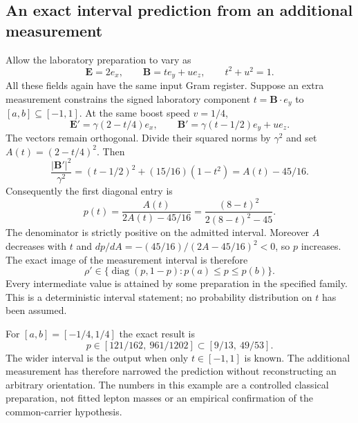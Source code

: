 \subsection{An exact interval prediction from an additional measurement}
Allow the laboratory preparation to vary as
\begin{equation}
 \boldsymbol E=2e_x,\qquad
 \boldsymbol B=t e_y+u e_z,\qquad t^2+u^2=1.
\end{equation}
All these fields again have the same input Gram register. Suppose
an extra measurement constrains the signed laboratory component
$t=\boldsymbol B\cdot e_y$ to $[a,b]\subseteq[-1,1]$. At the
same boost speed $v=1/4$,
\begin{equation}
 \boldsymbol E'=\gamma(2-t/4)e_x,\qquad
 \boldsymbol B'=\gamma(t-1/2)e_y+u e_z.
\end{equation}
The vectors remain orthogonal. Divide their squared norms by
$\gamma^2$ and set $A(t)=(2-t/4)^2$. Then
\begin{equation}
 \frac{|\boldsymbol B'|^2}{\gamma^2}
 =(t-1/2)^2+(15/16)(1-t^2)=A(t)-45/16.
\end{equation}
Consequently the first diagonal entry is
\begin{equation}
 p(t)=\frac{A(t)}{2A(t)-45/16}
     =\frac{(8-t)^2}{2(8-t)^2-45}.
\end{equation}
The denominator is strictly positive on the admitted interval.
Moreover $A$ decreases with $t$ and
$dp/dA=-(45/16)/(2A-45/16)^2<0$, so $p$ increases. The exact
image of the measurement interval is therefore
\begin{equation}
 \rho'\in\{\operatorname{diag}(p,1-p):p(a)\leq p\leq p(b)\}.
\end{equation}
Every intermediate value is attained by some preparation in the
specified family. This is a deterministic interval statement; no
probability distribution on $t$ has been assumed.

For $[a,b]=[-1/4,1/4]$ the exact result is
\begin{equation}
 p\in[121/162,\ 961/1202]
      \subset[9/13,\ 49/53].
\end{equation}
The wider interval is the output when only $t\in[-1,1]$ is known.
The additional measurement has therefore narrowed the prediction
without reconstructing an arbitrary orientation. The numbers in
this example are a controlled classical preparation, not fitted
lepton masses or an empirical confirmation of the common-carrier
hypothesis.

